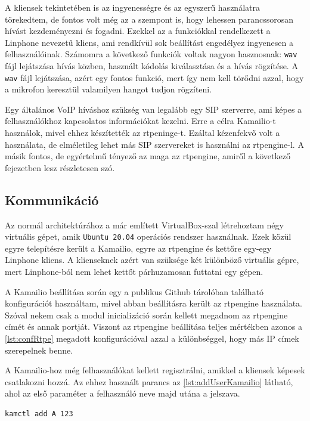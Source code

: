 A kliensek tekintetében is az ingyenességre és az egyszerű használatra törekedtem, 
de fontos volt még az a szempont is, hogy lehessen parancssorosan hívást kezdeményezni
és fogadni. Ezekkel az a funkciókkal rendelkezett a Linphone nevezetű kliens, ami
rendkívül sok beállítást engedélyez ingyenesen a felhasználóinak. Számomra a következő
funkciók voltak nagyon hasznosnak: \texttt{wav} fájl lejátszása hívás közben, használt 
kódolás kiválasztása és a hívás rögzítése. A \texttt{wav} fájl lejátszása, azért egy 
fontos funkció, mert így nem kell törődni azzal, hogy a mikrofon keresztül valamilyen 
hangot tudjon rögzíteni.

Egy általános VoIP híváshoz szükség van legalább egy SIP szerverre, ami képes a 
felhasználókhoz kapcsolatos információkat kezelni. Erre a célra Kamailio-t használok, 
mivel ehhez készítették az rtpeninge-t. Ezáltal kézenfekvő volt a használata, de 
elméletileg lehet más SIP szervereket is használni az rtpengine-l. A másik fontos, de 
egyértelmű tényező az maga az rtpengine, amiről a következő fejezetben lesz részletesen 
szó. 

\subsection{Kommunikáció}

Az normál architektúrához a már említett VirtualBox-szal létrehoztam négy virtuális gépet,
amik \texttt{Ubuntu 20.04} operációs rendszer használnak. Ezek közül egyre telepítésre 
került a Kamailio, egyre az rtpengine és kettőre egy-egy Linphone kliens. A klienseknek 
azért van szüksége két különböző virtuális gépre, mert Linphone-ból nem lehet kettőt
párhuzamosan futtatni egy gépen.

A Kamailio beállítása során egy a publikus Github tárolóban található konfigurációt
használtam, mivel abban beállításra került az rtpengine használata. Szóval nekem 
csak a modul inicializáció során kellett megadnom az rtpengine címét és annak portját. 
Viszont az rtpengine beállítása teljes mértékben azonos a \ref{lst:confRtpe} megadott 
konfigurációval azzal a különbséggel, hogy más IP címek szerepelnek benne.

A Kamailio-hoz még felhasználókat kellett regisztrálni, amikkel a kliensek képesek 
csatlakozni hozzá. Az ehhez használt parancs az \ref{lst:addUserKamailio} látható, ahol 
az első paraméter a felhasználó neve majd utána a jelszava.

\begin{lstlisting}[caption=Felhasználó hozzáadása Kamailio-hoz, label=lst:addUserKamailio]
kamctl add A 123
\end{lstlisting}

